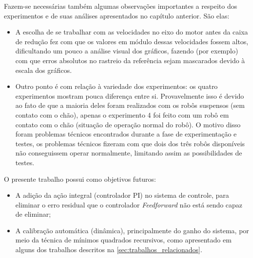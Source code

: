 Fazem-se necessárias também algumas observações importantes a respeito dos experimentos e de suas análises apresentados no capítulo anterior. São elas: 

\begin{itemize}
    \item A escolha de se trabalhar com as velocidades no eixo do motor antes da caixa de redução fez com que os valores em módulo dessas velocidades fossem altos, dificultando um pouco a análise visual dos gráficos, fazendo (por exemplo) com que erros absolutos no rastreio da referência sejam mascarados devido à escala dos gráficos.
    
    \item Outro ponto é com relação à variedade dos experimentos: os quatro experimentos mostram pouca diferença entre si. Provavelmente isso é devido ao fato de que a maioria deles foram realizados com os robôs suspensos (sem contato com o chão), apenas o experimento 4 foi feito com um robô em contato com o chão (situação de operação normal do robô). O motivo disso foram problemas técnicos encontrados durante a fase de experimentação e testes, os problemas técnicos fizeram com que dois dos três robôs disponíveis não conseguissem operar normalmente, limitando assim as possibilidades de testes.\\
\end{itemize}


O presente trabalho possui como objetivos futuros: 

\begin{itemize}
    \item A adição da ação integral (controlador PI) no sistema de controle, para eliminar o erro residual que o controlador \emph{Feedforward} não está sendo capaz de eliminar;
    
    \item A calibração automática (dinâmica), principalmente do ganho do sistema, por meio da técnica de mínimos quadrados recursivos, como apresentado em alguns dos trabalhos descritos na \autoref{sec:trabalhos_relacionados}.
\end{itemize}

 

